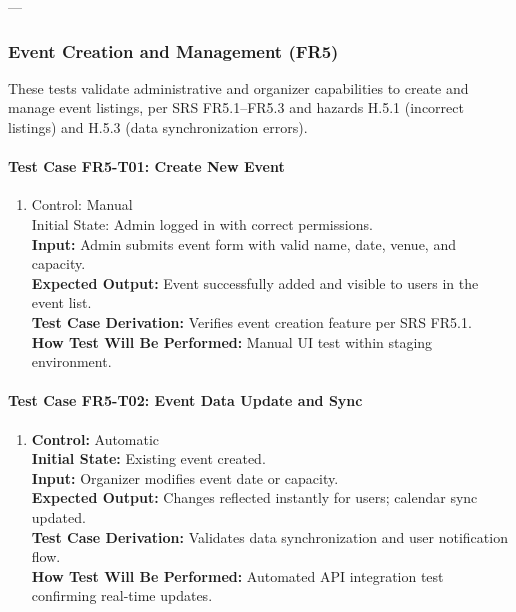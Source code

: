 \documentclass[12pt, titlepage]{article}
\begin{document}
---

\subsubsection{Event Creation and Management (FR5)}

These tests validate administrative and organizer capabilities to create and manage event listings,
per SRS FR5.1–FR5.3 and hazards H.5.1 (incorrect listings) and H.5.3 (data synchronization errors).

\paragraph{Test Case FR5-T01: Create New Event}

\begin{enumerate}
    \item Control: Manual\\
    Initial State: Admin logged in with correct permissions.\\
    \textbf{Input:} Admin submits event form with valid name, date, venue, and capacity.\\
    \textbf{Expected Output:} Event successfully added and visible to users in the event list.\\
    \textbf{Test Case Derivation:} Verifies event creation feature per SRS FR5.1.\\
    \textbf{How Test Will Be Performed:} Manual UI test within staging environment.
\end{enumerate}

\paragraph{Test Case FR5-T02: Event Data Update and Sync}

\begin{enumerate}
    \item \textbf{Control:} Automatic\\
    \textbf{Initial State:} Existing event created.\\
    \textbf{Input:} Organizer modifies event date or capacity.\\
    \textbf{Expected Output:} Changes reflected instantly for users; calendar sync updated.\\
    \textbf{Test Case Derivation:} Validates data synchronization and user notification flow.\\
    \textbf{How Test Will Be Performed:} Automated API integration test confirming real-time updates.
\end{enumerate}
\end{document}
